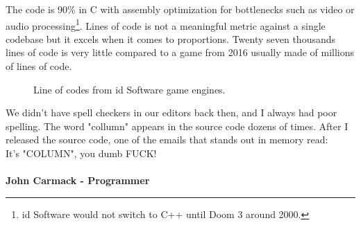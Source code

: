 \documentclass[book.tex]{subfiles}
\begin{document}
\par
 The code is 90\% in C with assembly optimization for bottlenecks such as video or audio processing\footnote{id Software would not switch to C++ until Doom 3 around 2000.}. Lines of code is not a meaningful metric against a single codebase but it excels when it comes to proportions. Twenty seven thousands lines of code is very little compared to a game from 2016 usually made of millions of lines of code.\\
\par
\begin{figure}[H]
\centering
   \caption{Line of codes from id Software game engines.}
 \end{figure}
 
\par

 \begin{fancyquotes}
   We didn't have spell checkers in our editors back then, and I always had poor spelling.  The word "collumn" appears in the source code dozens of times.  After I released the source code, one of the emails that stands out in memory read:
 \bigskip \\
It's "COLUMN", you dumb FUCK!\\
 \bigskip \\
\textbf{John Carmack - Programmer}
 \end{fancyquotes}
 
\end{document}
